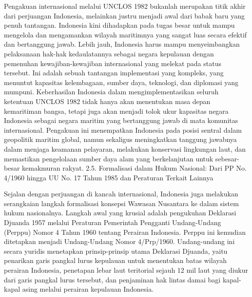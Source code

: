 \documentclass[12pt, a4paper]{article}
\begin{document}
Pengakuan internasional melalui UNCLOS 1982 bukanlah merupakan titik akhir dari perjuangan Indonesia, melainkan justru menjadi awal dari babak baru yang penuh tantangan. Indonesia kini dihadapkan pada tugas besar untuk mampu mengelola dan mengamankan wilayah maritimnya yang sangat luas secara efektif dan bertanggung jawab. Lebih jauh, Indonesia harus mampu menyeimbangkan pelaksanaan hak-hak kedaulatannya sebagai negara kepulauan dengan pemenuhan kewajiban-kewajiban internasional yang melekat pada status tersebut. Ini adalah sebuah tantangan implementasi yang kompleks, yang menuntut kapasitas kelembagaan, sumber daya, teknologi, dan diplomasi yang mumpuni. Keberhasilan Indonesia dalam mengimplementasikan seluruh ketentuan UNCLOS 1982 tidak hanya akan menentukan masa depan kemaritiman bangsa, tetapi juga akan menjadi tolok ukur kapasitas negara Indonesia sebagai negara maritim yang bertanggung jawab di mata komunitas internasional. Pengakuan ini menempatkan Indonesia pada posisi sentral dalam geopolitik maritim global, namun sekaligus meningkatkan tanggung jawabnya dalam menjaga keamanan pelayaran, melakukan konservasi lingkungan laut, dan memastikan pengelolaan sumber daya alam yang berkelanjutan untuk sebesar-besar kemakmuran rakyat.
2.5. Formalisasi dalam Hukum Nasional: Dari PP No. 4/1960 hingga UU No. 17 Tahun 1985 dan Peraturan Terkait Lainnya

Sejalan dengan perjuangan di kancah internasional, Indonesia juga melakukan serangkaian langkah formalisasi konsepsi Wawasan Nusantara ke dalam sistem hukum nasionalnya. Langkah awal yang krusial adalah pengukuhan Deklarasi Djuanda 1957 melalui Peraturan Pemerintah Pengganti Undang-Undang (Perppu) Nomor 4 Tahun 1960 tentang Perairan Indonesia. Perppu ini kemudian ditetapkan menjadi Undang-Undang Nomor 4/Prp/1960. Undang-undang ini secara yuridis menetapkan prinsip-prinsip utama Deklarasi Djuanda, yaitu penarikan garis pangkal lurus kepulauan untuk menentukan batas wilayah perairan Indonesia, penetapan lebar laut teritorial sejauh 12 mil laut yang diukur dari garis pangkal lurus tersebut, dan penjaminan hak lintas damai bagi kapal-kapal asing melalui perairan kepulauan Indonesia.  
\end{document}
